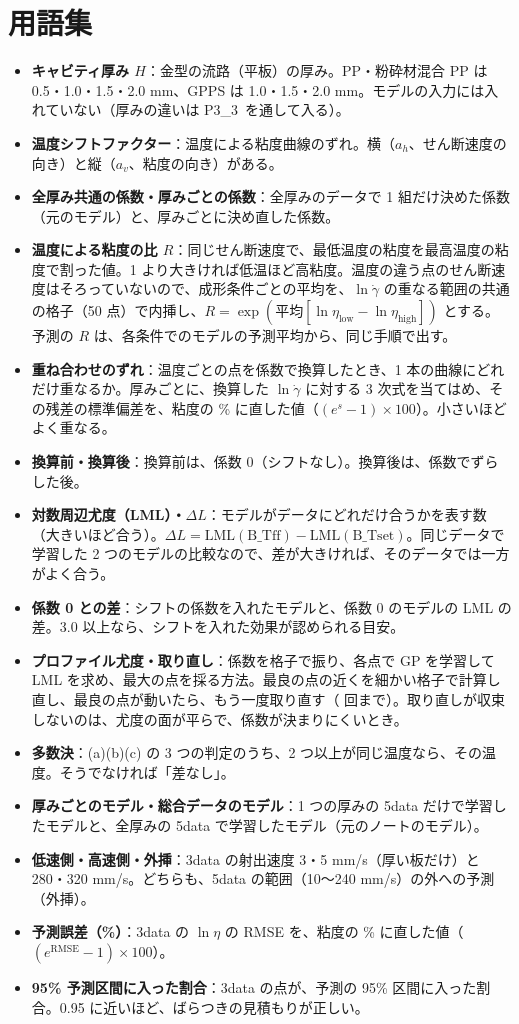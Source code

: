 \documentclass[paper=a4paper,fontsize=10.5pt,line_length=44zw,number_of_lines=38]{jlreq}
\newcommand{\file}[1]{\texttt{\detokenize{#1}}}
\newcommand{\gd}{\dot{\gamma}}
\newcommand{\PIII}{P3\_3}
\newenvironment{termlist}{\begin{itemize}[label=・,leftmargin=1\zw,labelwidth=1\zw,labelsep=0pt,itemsep=0.4ex,topsep=0.6ex,parsep=0pt]}{\end{itemize}}
\newcommand{\term}[1]{\item \textbf{#1}：}
\begin{document}
\section{用語集}
\begin{termlist}
\term{キャビティ厚み $H$}金型の流路（平板）の厚み。PP・粉砕材混合 PP は 0.5・1.0・1.5・2.0 mm、GPPS は 1.0・1.5・2.0 mm。モデルの入力には入れていない（厚みの違いは \PIII\ を通して入る）。
\term{温度シフトファクター}温度による粘度曲線のずれ。横（$a_h$、せん断速度の向き）と縦（$a_v$、粘度の向き）がある。
\term{全厚み共通の係数・厚みごとの係数}全厚みのデータで 1 組だけ決めた係数（元のモデル）と、厚みごとに決め直した係数。
\term{温度による粘度の比 $R$}同じせん断速度で、最低温度の粘度を最高温度の粘度で割った値。1 より大きければ低温ほど高粘度。温度の違う点のせん断速度はそろっていないので、成形条件ごとの平均を、$\ln\gd$ の重なる範囲の共通の格子（50 点）で内挿し、$R=\exp(\text{平均}[\ln\eta_{\text{low}}-\ln\eta_{\text{high}}])$ とする。予測の $R$ は、各条件でのモデルの予測平均から、同じ手順で出す。
\term{重ね合わせのずれ}温度ごとの点を係数で換算したとき、1 本の曲線にどれだけ重なるか。厚みごとに、換算した $\ln\gd$ に対する 3 次式を当てはめ、その残差の標準偏差を、粘度の \% に直した値（$(e^{s}-1)\times100$）。小さいほどよく重なる。
\term{換算前・換算後}換算前は、係数 0（シフトなし）。換算後は、係数でずらした後。
\term{対数周辺尤度（LML）・$\Delta L$}モデルがデータにどれだけ合うかを表す数（大きいほど合う）。$\Delta L=\mathrm{LML}(\text{B\_Tff})-\mathrm{LML}(\text{B\_Tset})$。同じデータで学習した 2 つのモデルの比較なので、差が大きければ、そのデータでは一方がよく合う。
\term{係数 0 との差}シフトの係数を入れたモデルと、係数 0 のモデルの LML の差。3.0 以上なら、シフトを入れた効果が認められる目安。
\term{プロファイル尤度・取り直し}係数を格子で振り、各点で GP を学習して LML を求め、最大の点を採る方法。最良の点の近くを細かい格子で計算し直し、最良の点が動いたら、もう一度取り直す（\file{MAX_REFINE} 回まで）。取り直しが収束しないのは、尤度の面が平らで、係数が決まりにくいとき。
\term{多数決}(a)(b)(c) の 3 つの判定のうち、2 つ以上が同じ温度なら、その温度。そうでなければ「差なし」。
\term{厚みごとのモデル・総合データのモデル}1 つの厚みの 5data だけで学習したモデルと、全厚みの 5data で学習したモデル（元のノートのモデル）。
\term{低速側・高速側・外挿}3data の射出速度 3・5 mm/s（厚い板だけ）と 280・320 mm/s。どちらも、5data の範囲（10〜240 mm/s）の外への予測（外挿）。
\term{予測誤差（\%）}3data の $\ln\eta$ の RMSE を、粘度の \% に直した値（$(e^{\mathrm{RMSE}}-1)\times100$）。
\term{95\% 予測区間に入った割合}3data の点が、予測の 95\% 区間に入った割合。0.95 に近いほど、ばらつきの見積もりが正しい。
\end{termlist}
\end{document}
